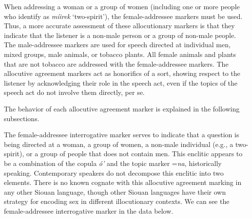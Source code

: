 When addressing a woman or a group of women (including one or more people who identify as \textit{míirek} `two-spirit'), the female-addressee markers must be used. Thus, a more accurate assessment of these allocutionary markers is that they indicate that the listener is a non-male person or a group of non-male people. The male-addressee markers are used for speech directed at individual men, mixed groups, male animals, or tobacco plants. All female animals and plants that are not tobacco are addressed with the female-addressee markers. The allocutive agreement markers act as honorifics of a sort, showing respect to the listener by acknowledging their role in the speech act, even if the topics of the speech act do not involve them directly, per se.

The behavior of each allocutive agreement marker is explained in the following subsections.


The female-addressee interrogative marker serves to indicate that a question is being directed at a woman, a group of women, a non-male individual (e.g., a two-spirit), or a group of people that does not contain men. This enclitic appears to be a combination of the copula \textit{ó'} and the topic marker =\textit{na}, historically speaking. Contemporary speakers do not decompose this enclitic into two elements. There is no known cognate with this allocutive agreement marking in any other Siouan language, though other Siouan languages have their own strategy for encoding sex in different illocutionary contexts. We can see the female-addressee interrogative marker in the data below.

